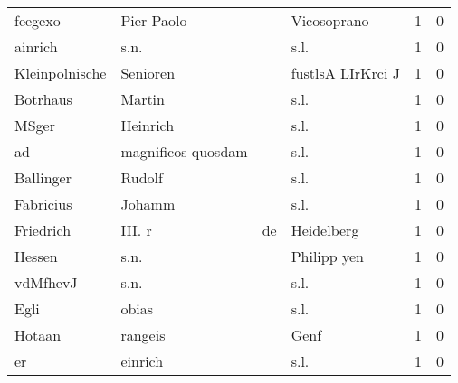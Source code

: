 \documentclass[10pt,a4paper,landscape]{article}
\begin{document}
\begin{longtable}{llllrr}
                  feegexo &                         Pier Paolo &             &                                 Vicosoprano &          1 &         0 \\
                  ainrich &                               s.n. &             &                                        s.l. &          1 &         0 \\
           Kleinpolnische &                           Senioren &             &                           fustlsA LIrKrci J &          1 &         0 \\
                 Botrhaus &                             Martin &             &                                        s.l. &          1 &         0 \\
                    MSger &                           Heinrich &             &                                        s.l. &          1 &         0 \\
                       ad &                 magnificos quosdam &             &                                        s.l. &          1 &         0 \\
                Ballinger &                             Rudolf &             &                                        s.l. &          1 &         0 \\
                Fabricius &                             Johamm &             &                                        s.l. &          1 &         0 \\
                Friedrich &                             III. r &          de &                                  Heidelberg &          1 &         0 \\
                   Hessen &                               s.n. &             &                                 Philipp yen &          1 &         0 \\
                 vdMfhevJ &                               s.n. &             &                                        s.l. &          1 &         0 \\
                     Egli &                              obias &             &                                        s.l. &          1 &         0 \\
                   Hotaan &                            rangeis &             &                                        Genf &          1 &         0 \\
                       er &                            einrich &             &                                        s.l. &          1 &         0 \\

\end{longtable}
\end{document}
